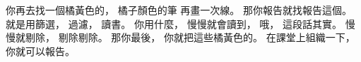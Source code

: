 \hypertarget{w01:cue:2835}{}你再去找一個橘黃色的，
\hypertarget{w01:cue:2836}{}橘子顏色的筆
\hypertarget{w01:cue:2837}{}再畫一次線。
\hypertarget{w01:cue:2838}{}那你報告就找報告這個。
\hypertarget{w01:cue:2839}{}就是用篩選，
\hypertarget{w01:cue:2840}{}過濾，
\hypertarget{w01:cue:2841}{}讀書。
\hypertarget{w01:cue:2842}{}你用什麼，
\hypertarget{w01:cue:2843}{}慢慢就會讀到，
\hypertarget{w01:cue:2844}{}哦，
\hypertarget{w01:cue:2845}{}這段話其實。
\hypertarget{w01:cue:2846}{}慢慢就剔除，
\hypertarget{w01:cue:2847}{}剔除剔除。
\hypertarget{w01:cue:2848}{}那你最後，
\hypertarget{w01:cue:2849}{}你就把這些橘黃色的。
\hypertarget{w01:cue:2850}{}在課堂上組織一下，
\hypertarget{w01:cue:2851}{}你就可以報告。

